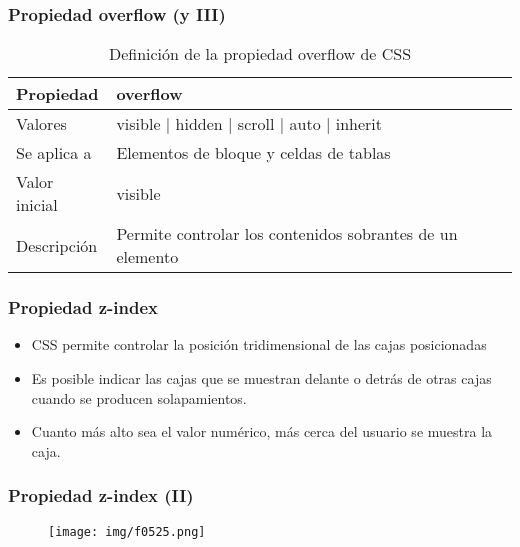 \begin{frame}
\frametitle{Propiedad overflow (y III)}

\begin{center}
  \begin{table}
   \begin{tabular}{p{1.8cm}p{7.8cm}}
Propiedad & \bf{overflow} \\ \hline
Valores& visible | hidden | scroll | auto | inherit \\ \hline
Se aplica a& Elementos de bloque y celdas de tablas \\ \hline
Valor inicial& visible \\ \hline
Descripción& Permite controlar los contenidos sobrantes de un elemento \\ \hline
  \end{tabular}
   \caption{Definición de la propiedad overflow de CSS}
 \end{table}
\end{center}


\end{frame}




\begin{frame}
\frametitle{Propiedad z-index}

\begin{itemize}
  \item CSS permite controlar la posición tridimensional de las cajas posicionadas
  \item Es posible indicar las cajas que se muestran delante o detrás de otras cajas cuando se producen solapamientos.
  \item Cuanto más alto sea el valor numérico, más cerca del usuario se muestra la caja.
\end{itemize}

\end{frame}



\begin{frame}
\frametitle{Propiedad z-index (II)}


\begin{center}
\begin{figure}[p]
\texttt{[image: img/f0525.png]}
\end{figure}
\end{center}

\end{frame}



